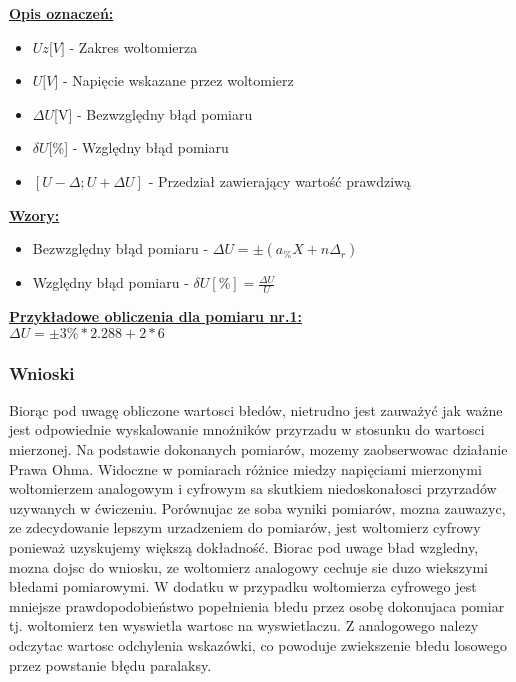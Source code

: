 \documentclass[a4paper,13pt]{extarticle}  %
\begin{document}
                \underline{\textbf{Opis oznaczeń:}}
                \begin{itemize}
                    \item $Uz{[}V{]}$ - Zakres woltomierza
                    \item $U{[}V{]}$ - Napięcie wskazane przez woltomierz
                    \item $\Delta U${[}V{]} - Bezwzględny błąd pomiaru
                    \item $\delta U${[}\%{]} - Względny błąd pomiaru
                    \item $[U-\Delta ; U+\Delta U] $ - Przedział zawierający wartość prawdziwą
                \end{itemize}
                \underline{\textbf{Wzory:}}
                \begin{itemize}
                    \item Bezwzględny błąd pomiaru - $\Delta U=\pm(a_{\%}X+n\Delta _r)$
                    \item Względny błąd pomiaru - $\delta U[\%]=\frac{\Delta U}{U}$
                \end{itemize}   
                \underline{\textbf{Przykładowe obliczenia dla pomiaru nr.1:}}\\
                $\Delta U=\pm 3\%*2.288+2*6$
                
            \subsubsection{Wnioski}
                Biorąc pod uwagę obliczone wartosci błedów, nietrudno jest zauważyć jak ważne
                jest odpowiednie wyskalowanie mnożników przyrzadu w stosunku do wartosci mierzonej. 
                Na podstawie dokonanych pomiarów, mozemy zaobserwowac działanie Prawa Ohma. 
                Widoczne w pomiarach różnice miedzy napięciami mierzonymi woltomierzem analogowym i cyfrowym sa skutkiem niedoskonałosci przyrzadów uzywanych w ćwiczeniu. 
                Porównujac ze soba wyniki pomiarów, mozna zauwazyc, ze zdecydowanie lepszym urzadzeniem do pomiarów, jest woltomierz cyfrowy ponieważ uzyskujemy większą dokładność. 
                Biorac pod uwage bład wzgledny, mozna dojsc do wniosku, ze woltomierz analogowy cechuje sie duzo wiekszymi błedami pomiarowymi.
                W dodatku w przypadku woltomierza cyfrowego jest mniejsze prawdopodobieństwo popełnienia błedu przez osobę dokonujaca pomiar tj.
                woltomierz ten wyswietla wartosc na wyswietlaczu. 
                Z analogowego nalezy odczytac wartosc odchylenia wskazówki, co powoduje zwiekszenie błedu losowego przez powstanie błędu paralaksy.
    
\end{document}
